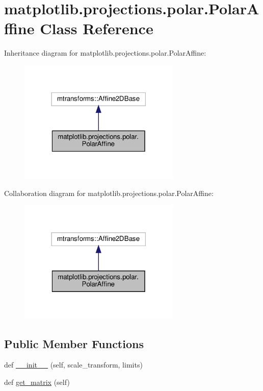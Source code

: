 \hypertarget{classmatplotlib_1_1projections_1_1polar_1_1PolarAffine}{}\section{matplotlib.\+projections.\+polar.\+Polar\+Affine Class Reference}
\label{classmatplotlib_1_1projections_1_1polar_1_1PolarAffine}


Inheritance diagram for matplotlib.\+projections.\+polar.\+Polar\+Affine\+:
\nopagebreak
\begin{figure}[H]
\begin{center}
\leavevmode
\includegraphics[width=218pt]{classmatplotlib_1_1projections_1_1polar_1_1PolarAffine__inherit__graph}
\end{center}
\end{figure}


Collaboration diagram for matplotlib.\+projections.\+polar.\+Polar\+Affine\+:
\nopagebreak
\begin{figure}[H]
\begin{center}
\leavevmode
\includegraphics[width=218pt]{classmatplotlib_1_1projections_1_1polar_1_1PolarAffine__coll__graph}
\end{center}
\end{figure}
\subsection*{Public Member Functions}
\begin{DoxyCompactItemize}
\item 
def \hyperlink{classmatplotlib_1_1projections_1_1polar_1_1PolarAffine_ad000b3b3040c383ccc4b1d3f6a53b90d}{\+\_\+\+\_\+init\+\_\+\+\_\+} (self, scale\+\_\+transform, limits)
\item 
def \hyperlink{classmatplotlib_1_1projections_1_1polar_1_1PolarAffine_a59a9449fa82d0ce186659bd816d6e441}{get\+\_\+matrix} (self)
\end{DoxyCompactItemize}


